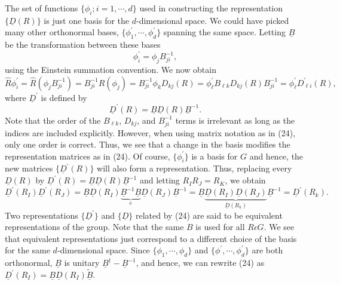 The set of functions $\{ \phi_i; i = 1 , \cdots , d\}$ used in 
constructing the representation $\{ \underline{D}(R)\}$ is just one 
basis for the $d$-dimensional space.  We could have picked many other 
orthonormal bases, $\{ \phi_1^{\prime} , \cdots , \phi^{\prime}_d \}$ 
spanning the same space.   Letting $\underline{B}$ be the 
transformation between these bases
\begin{equation}
\phi^{\prime}_i = \phi_j B^{-1}_{ji} ,
\label{chap16-eqno23}
\end{equation}
using the Einstein summation convention.  We now obtain
\begin{equation}
{\hat R} \phi^{\prime}_i = {\hat R} \left( \phi_j B_{ji}^{-1} 
\right) = B^{-1}_{ji} {\hat R} \left( \phi_j \right) = B^{-1}_{ji} 
\phi_k D_{kj}(R) = \phi^{\prime}_{\ell} B_{\ell k} D_{kj} (R) 
B^{-1}_{ji} = \phi^{\prime}_{\ell} D^{\prime}_{\ell i}(R),
\end{equation}
where $\underline{D}^{\prime}$ is defined by
\begin{equation}
\underline{D}^{\prime}(R) = \underline{B}\underline{D}(R) 
\underline{B}^{-1}.
\label{chap16-eqno24}
\end{equation}
Note that the order of the $B_{\ell k}$, $D_{kj}$, and $B^{-1}_{ji}$ 
terms is irrelevant as long as the indices are included explicitly.  
However, when using matrix notation as in (24), only one order is 
correct.  Thus, we see that a change in the basis modifies the 
representation matrices as in (24).  Of course, $\{ \phi^{\prime}_i\}$ 
is a basis for $G$ and hence, the new matrices $\{ 
\underline{D}^{\prime}(R)\}$ will also form a representation.  Thus, 
replacing every  $\underline{D}(R)$ by $\underline{D}^{\prime}(R) = 
\underline{B}\underline{D}(R)\underline{B}^{-1}$ and letting $R_IR_J = 
R_K$, we obtain
\begin{equation}
\underline{D}^{\prime}(R_I) \underline{D}^{\prime}(R_J) = 
\underline{B}\underline{D}(R_I) 
\underbrace{\underline{B}^{-1}\underline{B}}_{e} \underline{D} 
(R_J)\underline{B}^{-1} = \underline{B} 
\underbrace{\underline{D}(R_I) \underline{D}(R_J)}_{\underline{D}(R_k)} 
\underline{B}^{-1} = \underline{D}^{\prime}(R_k).
\end{equation}
Two representations $\{\underline{D}^{\prime}\}$ and $\{ 
\underline{D}\}$ related by (24) are said to be equivalent 
representations of the group.  Note that the same $B$ is used for 
all $R \epsilon G$.  We see that equivalent representations just 
correspond to a different choice of the basis for the same 
$d$-dimensional space.  Since $\{ \phi_1 , \cdots , \phi_d\}$ and $\{ 
\phi^{\prime} , \cdots , \phi^{\prime}_d\}$ are both orthonormal, 
$\underline{B}$ is unitary $\underline{B}^{\dag} - 
\underline{B}^{-1}$, and hence, we can rewrite (24) as
$\underline{D}^{\prime} \left( R_I \right) = 
\underline{B} \underline{D} \left( R_I \right) \underline{\tilde{B}}$.

